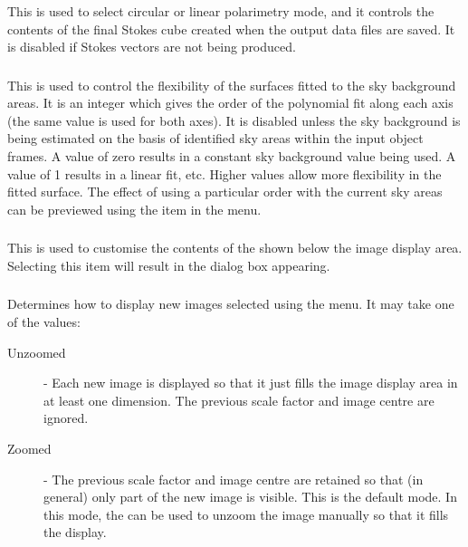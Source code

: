 \subsubsection {} This is used 
to select circular or linear polarimetry mode, and it controls the
contents of the final Stokes cube created when the output data files are
saved. It is disabled if Stokes vectors are not being produced. 

\subsubsection {} This is used to control
the flexibility of the surfaces fitted to the sky background areas. It is
an integer which gives the order of the polynomial fit along each axis
(the same value is used for both axes). It is disabled unless the sky
background is being estimated on the basis of identified sky areas within
the input object frames. A value of zero results in a constant sky
background value being used. A value of 1 results in a linear fit, etc.
Higher values allow more flexibility in the fitted surface. The effect of
using a particular order with the current sky areas can be previewed
using the 
 item in the 
 menu.

\subsubsection {} This is used to
customise the contents of the 
shown below the image display area. Selecting this item will result in the 
 dialog
box appearing.

\subsubsection {} Determines how to display new
images selected using the 
menu. It may take one of the values:

\begin{description}

\item [Unzoomed] - Each new image is displayed so that it just fills the 
image display area in at least one dimension. The previous scale factor
and image centre are ignored.

\item [Zoomed] - The previous scale factor and image centre are retained
so that (in general) only part of the new image is visible. This is the
default mode. In this mode, the  can
be used to unzoom the image manually so that it fills the display.

\end{description}

